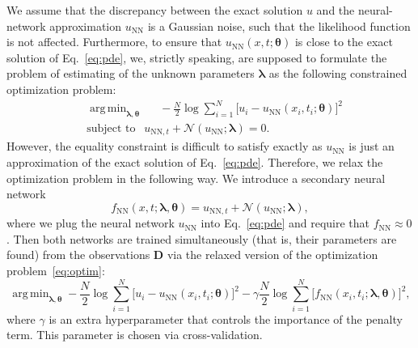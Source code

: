 \documentclass[a4paper, 12pt, parskip]{scrartcl}
\newcommand{\Data}{\vec{D}}
\renewcommand{\vec}[1]{\boldsymbol{#1}}
\newcommand{\VTheta}{\ensuremath{\vec{\theta}}}
\newcommand{\VLambda}{\ensuremath{\vec{\lambda}}}
\DeclareMathOperator*{\argmin}{arg\,min}
\newcommand{\UNN}[1][\text{NN}]{u_{#1}}
\newcommand{\FNN}[1][\text{NN}]{f_{#1}}
\newcommand{\NonlinOp}{\mathcal N\!}
\begin{document}
We assume that the discrepancy between the exact solution $u$ and the
neural-network approximation $\UNN$ is a Gaussian noise, such that the
likelihood function is not affected.
Furthermore, to ensure that $\UNN( x, t; \VTheta)$
is close to the exact solution of Eq.~\eqref{eq:pde}, we, strictly speaking,
are supposed to formulate the problem of estimating of the unknown parameters
$\VLambda$ as the following constrained optimization problem:
\begin{subequations}
\label{eq:optim}
\begin{align}
    &\argmin_{\VLambda, \VTheta} \quad \ \ -\frac{N}{2} \log
        \sum_{i=1}^N \big[u_i - \UNN(x_i, t_i; \VTheta)\big]^2  \\
    &\text{subject to } \ \ \UNN[\text{NN}, t]  + \NonlinOp(\UNN; \VLambda) = 0.
\end{align}
\end{subequations}
However, the equality constraint is difficult to satisfy exactly as
$u_{\text{NN}}$ is just an approximation of the exact solution of
Eq.~\eqref{eq:pde}.
Therefore, we relax the optimization problem in the following way.
We introduce a secondary neural network
\begin{equation}
    \FNN(x, t; \VLambda, \VTheta) =
        u_{\text{NN}, t} + \NonlinOp(u_{\text{NN}}; \VLambda),
\end{equation}
where we plug the neural network $\UNN$ into Eq.~\eqref{eq:pde} and
require that $\FNN \approx 0$.
Then both networks are trained simultaneously (that is, their parameters are
found) from the observations $\Data$ via the relaxed version of the optimization
problem~\eqref{eq:optim}:
\begin{equation}
    \argmin_{\VLambda, \VTheta}
    -\frac N 2 \log \sum_{i=1}^N \big[ u_i - \UNN(x_i, t_i; \VTheta)\big ]^2
    -\gamma \frac N 2 \log \sum_{i=1}^N \big[ \FNN(x_i, t_i; \VLambda, \VTheta) \big]^2,
\end{equation}
where $\gamma$ is an extra hyperparameter that controls the importance of the
penalty term.
This parameter is chosen via cross-validation.
\end{document}
